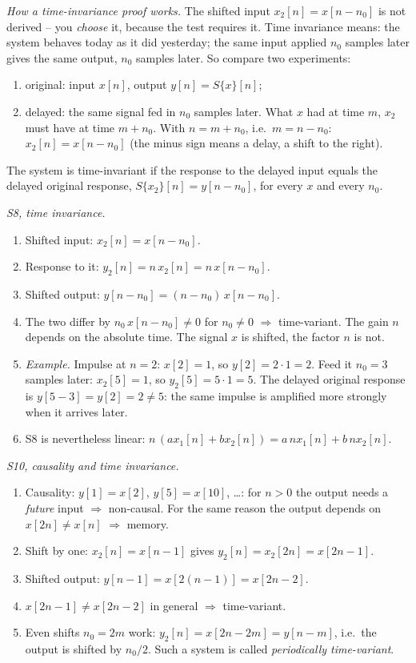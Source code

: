 \begin{solution}
\emph{How a time-invariance proof works.} The shifted input
$x_2[n]=x[n-n_0]$ is not derived -- you \emph{choose} it, because the test
requires it. Time invariance means: the system behaves today as it did
yesterday; the same input applied $n_0$ samples later gives the same output,
$n_0$ samples later. So compare two experiments:
\begin{enumerate}[label=(\roman*),leftmargin=*,itemsep=1pt]
  \item original: input $x[n]$, output $y[n]=S\{x\}[n]$;
  \item delayed: the same signal fed in $n_0$ samples later. What $x$ had at
    time $m$, $x_2$ must have at time $m+n_0$. With $n=m+n_0$, i.e.\
    $m=n-n_0$: $x_2[n]=x[n-n_0]$ (the minus sign means a delay, a shift to
    the right).
\end{enumerate}
The system is time-invariant if the response to the delayed input equals
the delayed original response, $S\{x_2\}[n]=y[n-n_0]$, for every $x$ and
every $n_0$.

\emph{S8, time invariance.}
\begin{enumerate}[label=Step \arabic*:,leftmargin=*,itemsep=1pt]
  \item Shifted input: $x_2[n]=x[n-n_0]$.
  \item Response to it: $y_2[n]=n\,x_2[n]=n\,x[n-n_0]$.
  \item Shifted output: $y[n-n_0]=(n-n_0)\,x[n-n_0]$.
  \item The two differ by $n_0\,x[n-n_0]\neq0$ for $n_0\neq0$
    $\Rightarrow$ time-variant. The gain $n$ depends on the absolute time.
    The signal $x$ is shifted, the factor $n$ is not.
  \item \emph{Example.} Impulse at $n=2$: $x[2]=1$, so $y[2]=2\cdot1=2$.
    Feed it $n_0=3$ samples later: $x_2[5]=1$, so $y_2[5]=5\cdot1=5$. The
    delayed original response is $y[5-3]=y[2]=2\neq5$: the same impulse is
    amplified more strongly when it arrives later.
  \item S8 is nevertheless linear:
    $n\,(ax_1[n]+bx_2[n])=a\,n x_1[n]+b\,n x_2[n]$.
\end{enumerate}

\emph{S10, causality and time invariance.}
\begin{enumerate}[label=Step \arabic*:,leftmargin=*,itemsep=1pt]
  \item Causality: $y[1]=x[2]$, $y[5]=x[10]$, \dots: for $n>0$ the output
    needs a \emph{future} input $\Rightarrow$ non-causal. For the same reason
    the output depends on $x[2n]\neq x[n]$ $\Rightarrow$ memory.
  \item Shift by one: $x_2[n]=x[n-1]$ gives $y_2[n]=x_2[2n]=x[2n-1]$.
  \item Shifted output: $y[n-1]=x[2(n-1)]=x[2n-2]$.
  \item $x[2n-1]\neq x[2n-2]$ in general $\Rightarrow$ time-variant.
  \item Even shifts $n_0=2m$ work: $y_2[n]=x[2n-2m]=y[n-m]$, i.e.\ the
    output is shifted by $n_0/2$. Such a system is called
    \emph{periodically time-variant}.
\end{enumerate}


\end{solution}
